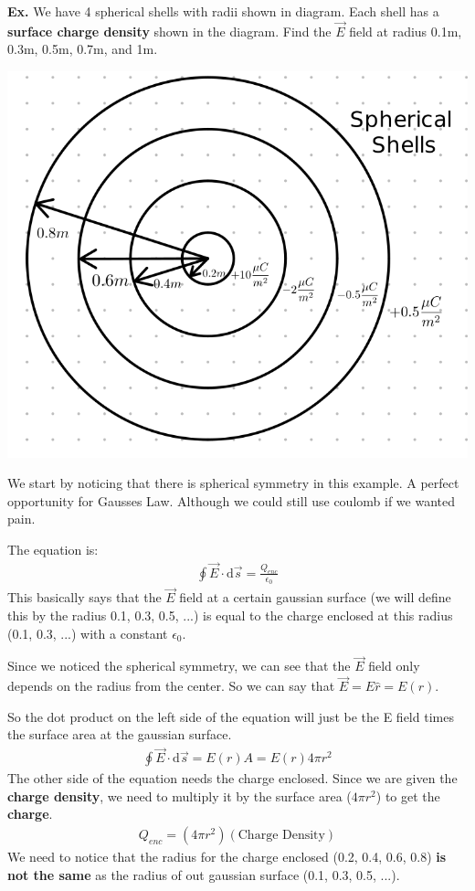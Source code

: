 \documentclass[12pt,letterpaper]{article} \usepackage{amsmath} \usepackage{graphicx} \usepackage[margin=1in]{geometry} \usepackage{longtable}  \usepackage{amssymb}
\begin{document}
	\begin{mdframed}
		\textbf{Ex. } We have 4 spherical shells with radii shown in diagram. Each shell has a \textbf{surface charge density} shown in the diagram. Find the $\vec E$ field at radius 0.1m, 0.3m, 0.5m, 0.7m, and 1m. 
		\begin{center}
			\includegraphics[width=0.6\linewidth]{gauss-law}
		\end{center}
		We start by noticing that there is spherical symmetry in this example. A perfect opportunity for Gausses Law. Although we could still use coulomb if we wanted pain. 
		
		The equation is:
		\begin{align*}
			\oint \vec E \cdot \mathrm d \vec s = \frac{Q_{enc}}{\epsilon_0}
		\end{align*}
		This basically says that the $\vec E$ field at a certain gaussian surface (we will define this by the radius 0.1, 0.3, 0.5, ...) is equal to the charge enclosed at this radius (0.1, 0.3, ...) with a constant $\epsilon_0$.
		
		Since we noticed the spherical symmetry, we can see that the $\vec E$ field only depends on the radius from the center. So we can say that $\vec E = E \hat r = E(r)$.
		
		So the dot product on the left side of the equation will just be the E field times the surface area at the gaussian surface. 
		\begin{align*}
			\oint\vec E \cdot \mathrm d \vec s = E(r) A = E(r) 4\pi r^2
		\end{align*}
		The other side of the equation needs the charge enclosed. Since we are given the \textbf{charge density}, we need to multiply it by the surface area ($4\pi r^2$) to get the \textbf{charge}.
		\begin{align*}
			Q_{enc} = (4\pi r^2)(\text{Charge Density})
		\end{align*}
		We need to notice that the radius for the charge enclosed (0.2, 0.4, 0.6, 0.8) \textbf{is not the same} as the radius of out gaussian surface (0.1, 0.3, 0.5, ...). 
		

\end{mdframed}
\end{document}
